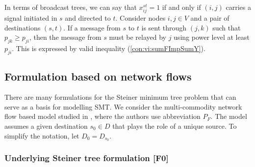 In terms of broadcast trees, we can say that $x_{ij}^{st}=1$ if and only if $(i,j)$ carries a signal initiated in $s$ and directed to $t$.
Consider nodes $i,j\in V$ and a pair of destinations $(s,t)$.
If a message from $s$ to $t$ is sent through $(j,k)$ such that $p_{jk}\geq p_{ji}$, then the message from $s$ must be relayed by $j$ using power level at least $p_{ji}$.
This is expressed by valid inequality (\ref{con:vi:sumFImpSumY}).

\subsection{Formulation based on network flows}

There are many formulations for the Steiner minimum tree problem that can serve as a basis for modelling SMT.
We consider the multi-commodity network flow based model studied in \cite{Polzin}, where the authors use abbreviation $P_{F}$.
The model assumes a given destination $s_0\in D$ that plays the role of a unique source.
To simplify the notation, let $D_0= D_{s_0}$.

\subsubsection{Underlying Steiner tree formulation [F0]}

